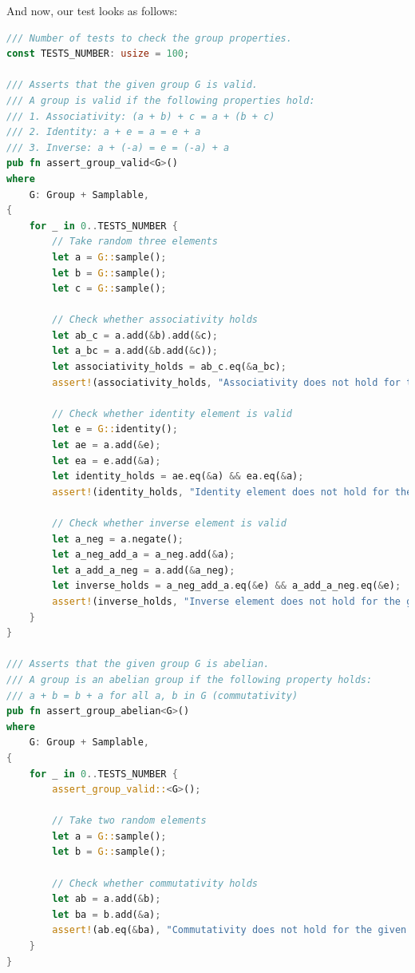 \documentclass[../lecture-notes.tex]{subfiles}
\begin{document}
And now, our test looks as follows:
\begin{lstlisting}[language=Rust]
/// Number of tests to check the group properties.
const TESTS_NUMBER: usize = 100;

/// Asserts that the given group G is valid.
/// A group is valid if the following properties hold:
/// 1. Associativity: (a + b) + c = a + (b + c)
/// 2. Identity: a + e = a = e + a
/// 3. Inverse: a + (-a) = e = (-a) + a
pub fn assert_group_valid<G>()
where
    G: Group + Samplable,
{
    for _ in 0..TESTS_NUMBER {
        // Take random three elements
        let a = G::sample();
        let b = G::sample();
        let c = G::sample();

        // Check whether associativity holds
        let ab_c = a.add(&b).add(&c);
        let a_bc = a.add(&b.add(&c));
        let associativity_holds = ab_c.eq(&a_bc);
        assert!(associativity_holds, "Associativity does not hold for the given group");

        // Check whether identity element is valid
        let e = G::identity();
        let ae = a.add(&e);
        let ea = e.add(&a);
        let identity_holds = ae.eq(&a) && ea.eq(&a);
        assert!(identity_holds, "Identity element does not hold for the given group");

        // Check whether inverse element is valid
        let a_neg = a.negate();
        let a_neg_add_a = a_neg.add(&a);
        let a_add_a_neg = a.add(&a_neg);
        let inverse_holds = a_neg_add_a.eq(&e) && a_add_a_neg.eq(&e);
        assert!(inverse_holds, "Inverse element does not hold for the given group");
    }
}

/// Asserts that the given group G is abelian.
/// A group is an abelian group if the following property holds:
/// a + b = b + a for all a, b in G (commutativity)
pub fn assert_group_abelian<G>()
where
    G: Group + Samplable,
{
    for _ in 0..TESTS_NUMBER {
        assert_group_valid::<G>();

        // Take two random elements
        let a = G::sample();
        let b = G::sample();

        // Check whether commutativity holds
        let ab = a.add(&b);
        let ba = b.add(&a);
        assert!(ab.eq(&ba), "Commutativity does not hold for the given group");
    }
}    
\end{lstlisting}
\end{document}
